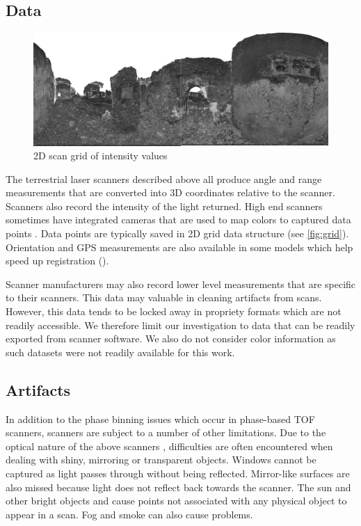 \subsection{Data} \label{sec:data}

\begin{figure}[ht]
  \centering
  \includegraphics[width=1\linewidth]{images/grid}
  \caption{2D scan grid of intensity values}
  \label{fig:grid}
\end{figure}

The terrestrial laser scanners described above all produce angle and range measurements that are converted into 3D coordinates relative to the scanner. Scanners also record the intensity of the light returned. High end scanners sometimes have integrated cameras that are used to map colors to captured data points \cite{Frohlich2004}. Data points are typically saved in 2D grid data structure (see \autoref{fig:grid}). Orientation and GPS measurements are also available in some models which help speed up registration ().

Scanner manufacturers may also record lower level measurements that are specific to their scanners. This data may valuable in cleaning artifacts from scans. However, this data tends to be locked away in propriety formats which are not readily accessible. We therefore limit our investigation to data that can be readily exported from scanner software. We also do not consider color information as such datasets were not readily available for this work.


\subsection{Artifacts} \label{sec:artifacts}

In addition to the phase binning issues which occur in phase-based TOF scanners, scanners are subject to a number of other limitations. Due to the optical nature of the above scanners , difficulties are often encountered when dealing with shiny, mirroring or transparent objects. Windows cannot be captured as light passes through without being reflected. Mirror-like surfaces are also missed because light does not reflect back towards the scanner. The sun and other bright objects and cause points not associated with any physical object to appear in a scan. Fog and smoke can also cause problems.

